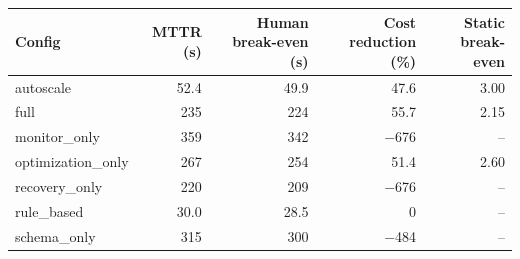 \begin{tabular}{lrrrr}
\toprule
Config & MTTR (s) & Human break-even (s) & Cost reduction (\%) & Static break-even \\
\midrule
autoscale & 52.4 & 49.9 & 47.6 & 3.00 \\
full & 235 & 224 & 55.7 & 2.15 \\
monitor\_only & 359 & 342 & \ensuremath{-}676 & -- \\
optimization\_only & 267 & 254 & 51.4 & 2.60 \\
recovery\_only & 220 & 209 & \ensuremath{-}676 & -- \\
rule\_based & 30.0 & 28.5 & 0 & -- \\
schema\_only & 315 & 300 & \ensuremath{-}484 & -- \\
\bottomrule
\end{tabular}
